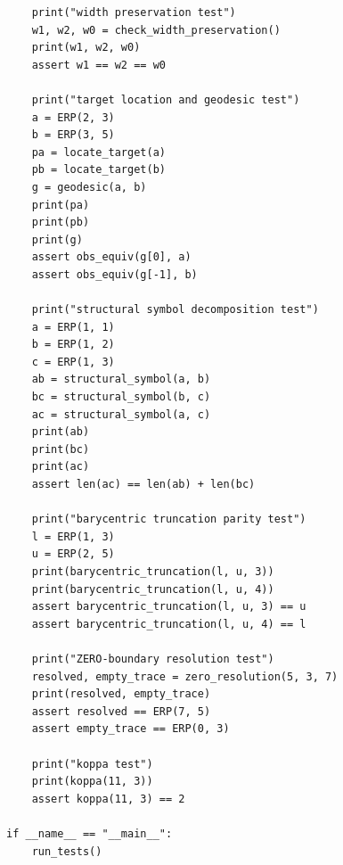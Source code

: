 \documentclass[11pt, letterpaper]{article}
\theoremstyle{definition}
\theoremstyle{plain}
\begin{document}
\begin{lstlisting}
    print("width preservation test")
    w1, w2, w0 = check_width_preservation()
    print(w1, w2, w0)
    assert w1 == w2 == w0

    print("target location and geodesic test")
    a = ERP(2, 3)
    b = ERP(3, 5)
    pa = locate_target(a)
    pb = locate_target(b)
    g = geodesic(a, b)
    print(pa)
    print(pb)
    print(g)
    assert obs_equiv(g[0], a)
    assert obs_equiv(g[-1], b)

    print("structural symbol decomposition test")
    a = ERP(1, 1)
    b = ERP(1, 2)
    c = ERP(1, 3)
    ab = structural_symbol(a, b)
    bc = structural_symbol(b, c)
    ac = structural_symbol(a, c)
    print(ab)
    print(bc)
    print(ac)
    assert len(ac) == len(ab) + len(bc)

    print("barycentric truncation parity test")
    l = ERP(1, 3)
    u = ERP(2, 5)
    print(barycentric_truncation(l, u, 3))
    print(barycentric_truncation(l, u, 4))
    assert barycentric_truncation(l, u, 3) == u
    assert barycentric_truncation(l, u, 4) == l

    print("ZERO-boundary resolution test")
    resolved, empty_trace = zero_resolution(5, 3, 7)
    print(resolved, empty_trace)
    assert resolved == ERP(7, 5)
    assert empty_trace == ERP(0, 3)

    print("koppa test")
    print(koppa(11, 3))
    assert koppa(11, 3) == 2

if __name__ == "__main__":
    run_tests()
\end{lstlisting}
\end{document}
